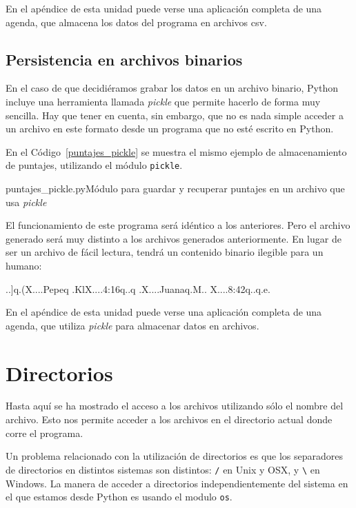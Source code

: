 En el apéndice de esta unidad puede verse una aplicación completa de una
agenda, que almacena los datos del programa en archivos csv.

\subsection{Persistencia en archivos binarios}

En el caso de que decidiéramos grabar los datos en un archivo binario,
Python incluye una herramienta llamada \textit{pickle} que permite hacerlo
de forma muy sencilla.  Hay que tener en cuenta, sin embargo, que no es
nada simple acceder a un archivo en este formato desde un programa que no
esté escrito en Python.

En el Código~\ref{puntajes_pickle} se muestra el mismo ejemplo de
almacenamiento de puntajes, utilizando el módulo \lstinline!pickle!.

\begin{codigo}{puntajes\_pickle.py}{Módulo para guardar y recuperar puntajes en
    un archivo que usa \emph{pickle}}
\label{puntajes_pickle}

\end{codigo}

El funcionamiento de este programa será idéntico a los anteriores.  Pero el
archivo generado será muy distinto a los archivos generados anteriormente.
En lugar de ser un archivo de fácil lectura, tendrá un contenido binario
ilegible para un humano:

\begin{codigo-nohl-sn}
..]q.(X....Pepeq
.KlX....4:16q..q
.X....Juanaq.M..
X....8:42q..q.e.
\end{codigo-nohl-sn}

En el apéndice de esta unidad puede verse una aplicación completa de una
agenda, que utiliza \emph{pickle} para almacenar datos en archivos.

\section{Directorios}

Hasta aquí se ha mostrado el acceso a los archivos utilizando sólo el
nombre del archivo. Esto nos permite acceder a los archivos en el
directorio actual donde corre el programa.

Un problema relacionado con la utilización de directorios es que los
separadores de directorios en distintos sistemas son distintos: \verb!/! en
Unix y OSX, y \verb!\! en Windows. La manera de acceder a directorios
independientemente del sistema en el que estamos desde Python es usando el
modulo \lstinline!os!.

